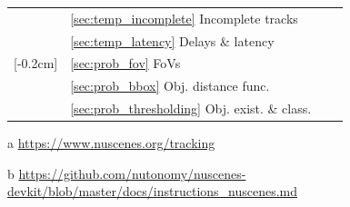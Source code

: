 \documentclass[conference]{IEEEtran}
\begin{document}
\begin{table}[htbp]
\begin{threeparttable}
\begin{tabularx}{\linewidth}{
			>{\hsize=0.02\hsize}X
			>{\hsize=0.38\hsize}X 
			>{\hsize=0.8\hsize}X 
			>{\hsize=0.8\hsize}X 
		}
		                                                                                        & \ref{sec:temp_incomplete} Incomplete tracks         & \tempChallengeIncomplete             & \tempDroneIncomplete                                                            \\ \cline{2-4}
		                                                                                        & \ref{sec:temp_latency} Delays \& latency            & \tempChallengeDelays                 & \tempDroneDelays                                                                \\ \midrule
		\parbox[t]{2mm}{[-0.2cm]{}}       & \ref{sec:prob_fov} FoVs                             & \probChallengeFoV                    & \probDroneFoV                                                                   \\ \cline{2-4}
		                                                                                        & \ref{sec:prob_bbox} Obj. distance func.             & \probChallengeObjDistance            & \probDroneObjDistance                                                           \\ \cline{2-4}
		                                                                                        & \ref{sec:prob_thresholding} Obj. exist. \& class.   & \probChallengeExistClass             & \probDroneExistClass                                                            \\ \bottomrule
	\end{tabularx}
	\begin{tablenotes}
		\item [a] \href{https://www.nuscenes.org/tracking}{https://www.nuscenes.org/tracking}
		\item [b] \href{https://github.com/nutonomy/nuscenes-devkit/blob/da3c9a977112fca05413dab4e944d911769385a9/docs/instructions_nuscenes.md}{https://github.com/nutonomy/nuscenes-devkit/blob/master/docs/instructions\_nuscenes.md}
	\end{tablenotes}
	\end{threeparttable}
\end{table}
\end{document}
